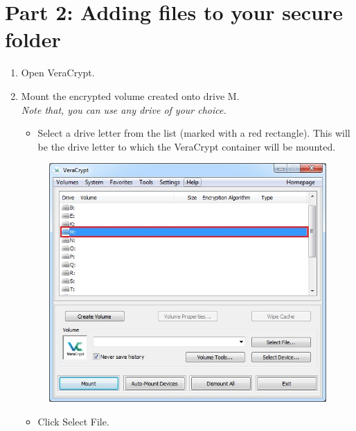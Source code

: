 \documentclass{tufte-handout}
\begin{document}
\section{Part 2: Adding files to your secure folder}
\begin{enumerate}
	\item Open VeraCrypt.
	\item Mount the encrypted volume created onto drive M. \\
	\textit{Note that, you can use any drive of your choice.}
	\begin{itemize}
		\item  Select a drive letter from the list (marked with a red rectangle). This will be the drive letter to which the VeraCrypt container will be mounted.
	\end{itemize}
	\begin{figure}%
		\includegraphics[width=\linewidth]{img/vc_mount_1.png}
	\end{figure}
	\FloatBarrier
	\begin{itemize}
		\item  Click Select File.
	\end{itemize}
	\begin{figure}%

\end{figure}
\end{enumerate}
\end{document}
